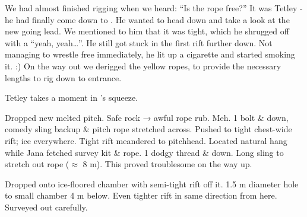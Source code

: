 We had almost finished rigging when we heard: ``Is the rope free?'' It
was Tetley - he had finally come down to . He wanted to
head down and take a look at the new going lead. We mentioned to him
that it was tight, which he shrugged off with a ``yeah, yeah\ldots{}''.
He still got stuck in the first rift further down. Not managing to
wrestle free immediately, he lit up a cigarette and started smoking it.
:) On the way out we derigged the yellow  ropes, to provide the
necessary lengths to rig down to  entrance.


\begin{marginfigure}
\checkoddpage \ifoddpage \forcerectofloat \else \forceversofloat \fi
\centering
 \caption{Tetley takes a moment in \protect{}'s squeeze. }
 \label{Tet planika smoke}
\end{marginfigure}


Dropped new melted pitch. Safe rock → awful rope rub. Meh. 1 bolt \&
down, comedy sling backup \& pitch rope stretched across. Pushed to
tight chest-wide rift; ice everywhere. Tight rift meandered to
pitchhead. Located natural hang while Jana fetched survey kit \& rope. 1
dodgy thread \& down. Long sling to stretch out rope ($\approx$ 8
m). This proved troublesome on the way up.

Dropped onto ice-floored
chamber with semi-tight rift off it. 1.5 m diameter hole to small chamber 4
m below. Even tighter rift in same direction from here. Surveyed out
carefully.

